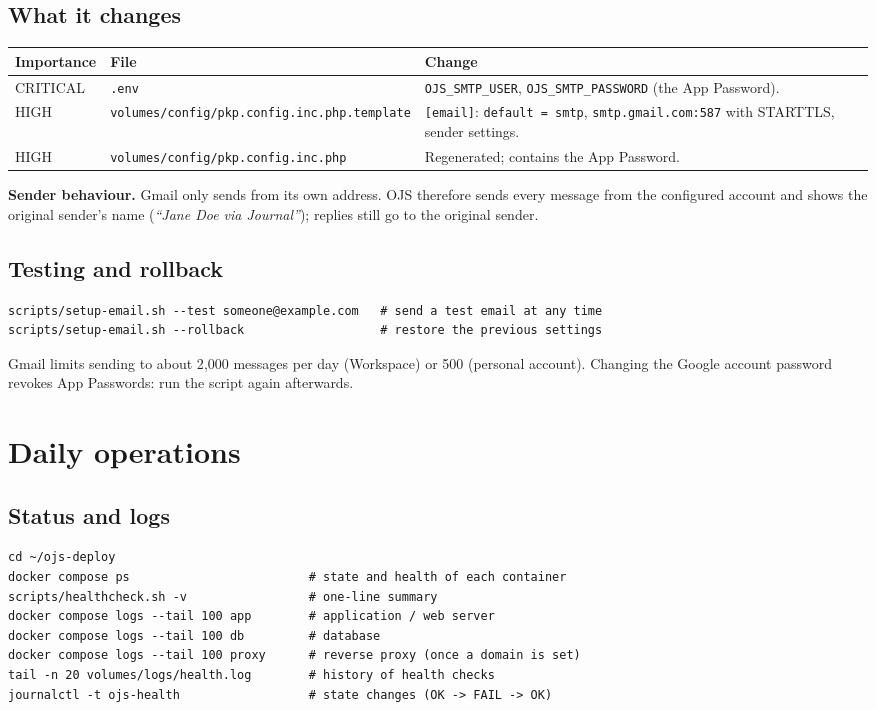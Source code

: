 \documentclass[11pt,a4paper]{report}
\newcommand{\code}[1]{\texttt{\small #1}}
\newcommand{\file}[1]{\texttt{\small #1}}
\begin{document}
\section{What it changes}
\begin{tabularx}{\linewidth}{@{}lP{5.6cm}L@{}}
\toprule
\textbf{Importance} & \textbf{File} & \textbf{Change} \\
\midrule
CRITICAL & \file{.env} & \code{OJS\_SMTP\_USER}, \code{OJS\_SMTP\_PASSWORD} (the App Password). \\
HIGH     & \file{volumes/config/\allowbreak pkp.config.inc.php.template} & \code{[email]}: \code{default = smtp}, \code{smtp.gmail.com:587} with STARTTLS, sender settings. \\
HIGH     & \file{volumes/config/\allowbreak pkp.config.inc.php} & Regenerated; contains the App Password. \\
\bottomrule
\end{tabularx}

\textbf{Sender behaviour.} Gmail only sends from its own address. OJS therefore sends every message
from the configured account and shows the original sender's name (\emph{``Jane Doe via
Journal''}); replies still go to the original sender.

\section{Testing and rollback}
\begin{lstlisting}
scripts/setup-email.sh --test someone@example.com   # send a test email at any time
scripts/setup-email.sh --rollback                   # restore the previous settings
\end{lstlisting}
\begin{note}
Gmail limits sending to about 2{,}000 messages per day (Workspace) or 500 (personal account).
Changing the Google account password revokes App Passwords: run the script again afterwards.
\end{note}

\chapter{Daily operations}\label{ch:ops}

\section{Status and logs}
\begin{lstlisting}
cd ~/ojs-deploy
docker compose ps                         # state and health of each container
scripts/healthcheck.sh -v                 # one-line summary
docker compose logs --tail 100 app        # application / web server
docker compose logs --tail 100 db         # database
docker compose logs --tail 100 proxy      # reverse proxy (once a domain is set)
tail -n 20 volumes/logs/health.log        # history of health checks
journalctl -t ojs-health                  # state changes (OK -> FAIL -> OK)
\end{lstlisting}
\end{document}
